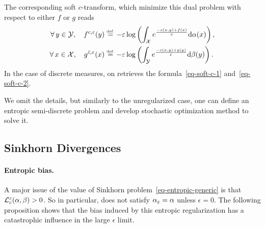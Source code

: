 The corresponding soft $c$-transform, which minimize this dual problem with respect to either $f$ or $g$ reads 
\begin{align*}
	\forall \, y \in \mathcal{Y}, \quad
	f^{c,\varepsilon}(y) &\stackrel{\mbox{\upshape\tiny def.}}{=} - \varepsilon \log\left(  
			\int_{\mathcal{X}} e^{\frac{-c(x,y) + f(x)}{\varepsilon}} \mathrm{d}\alpha(x)
	 \right),\\
	\forall \, x \in \mathcal{X}, \quad
	g^{\bar{c},\varepsilon}(x) &\stackrel{\mbox{\upshape\tiny def.}}{=} - \varepsilon \log\left(  
			\int_{\mathcal{Y}} e^{\frac{-c(x,y) + g(y)}{\varepsilon}} \mathrm{d}\beta(y)
	 \right).
\end{align*}
In the case of discrete measures, on retrieves the formula~\eqref{eq-soft-c-1} and~\eqref{eq-soft-c-2}.

We omit the details, but similarly to the unregularized case, one can define an entropic semi-discrete problem and develop stochastic optimization method to solve it. 

%


  


  

\subsection{Sinkhorn Divergences}
\label{sec-sinkhorn-div}


\paragraph{Entropic bias.}

A major issue of the value of Sinkhorn problem~\eqref{eq-entropic-generic} is that $\mathcal{L}_c^\varepsilon(\alpha,\beta)>0$. So in particular, 
\eq{
	\al_\epsilon = \uargmin{\be} \MK_\c^\epsilon(\al,\be)
}
does not satisfy $\alpha_\varepsilon=\alpha$ unless $\epsilon=0$. The following proposition shows that the bias induced by this entropic regularization has a catastrophic influence in the large $\epsilon$ limit.

